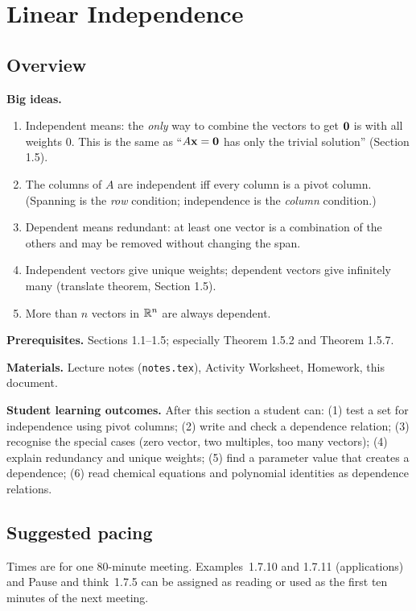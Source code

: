 \documentclass[11pt]{article}
\begin{document}
\section{Linear Independence}

\subsection*{Overview}
\textbf{Big ideas.}
\begin{enumerate}[nosep]
  \item Independent means: the \emph{only} way to combine the vectors to get $\mathbf{0}$ is with all weights $0$. This is the same as ``$A\mathbf{x}=\mathbf{0}$ has only the trivial solution'' (Section 1.5).
  \item The columns of $A$ are independent iff every column is a pivot column. (Spanning is the \emph{row} condition; independence is the \emph{column} condition.)
  \item Dependent means redundant: at least one vector is a combination of the others and may be removed without changing the span.
  \item Independent vectors give unique weights; dependent vectors give infinitely many (translate theorem, Section 1.5).
  \item More than $n$ vectors in $\mathbb{R}^n$ are always dependent.
\end{enumerate}
\textbf{Prerequisites.} Sections 1.1--1.5; especially Theorem 1.5.2 and Theorem 1.5.7.

\textbf{Materials.} Lecture notes (\texttt{notes.tex}), Activity Worksheet, Homework, this document.

\textbf{Student learning outcomes.} After this section a student can: (1) test a set for independence using pivot columns; (2) write and check a dependence relation; (3) recognise the special cases (zero vector, two multiples, too many vectors); (4) explain redundancy and unique weights; (5) find a parameter value that creates a dependence; (6) read chemical equations and polynomial identities as dependence relations.

\subsection*{Suggested pacing}
Times are for one 80-minute meeting. Examples~1.7.10 and 1.7.11 (applications) and Pause and think~1.7.5 can be assigned as reading or used as the first ten minutes of the next meeting.
\end{document}
